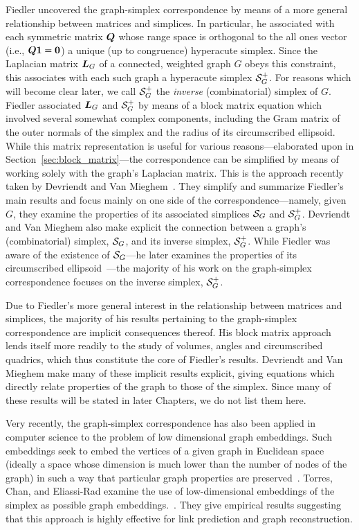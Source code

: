 Fiedler uncovered  the graph-simplex correspondence by means of  a more general  relationship between matrices and simplices.  In particular, he associated with each symmetric matrix $\vb*{Q}$ whose range space is orthogonal to the all ones vector (i.e.,  $\vb*{Q}\vb{1}=\vb{0}$) a unique (up to congruence) hyperacute simplex. Since the Laplacian  matrix  $\vb*{L}_G$ of a connected, weighted graph  $G$ obeys this constraint, this associates with  each such graph a hyperacute simplex  $\mathcal{S}_G^+$.   
For  reasons which will become clear later, we call $\mathcal{S}_G^+$ the \emph{inverse} (combinatorial) simplex of $G$. 
Fiedler associated $\vb*{L}_G$ and $\mathcal{S}_G^+$  by means of a block matrix equation which involved several somewhat complex components, including  the Gram matrix of the outer normals of the simplex and  the radius of its circumscribed ellipsoid. While this matrix representation is useful for various reasons---elaborated upon in  Section~\ref{sec:block_matrix}---the correspondence can  be simplified  by means of working solely  with the graph's Laplacian  matrix. This is the approach  recently taken by Devriendt  and  Van  Mieghem~\cite{devriendt2018simplex}. They simplify and summarize Fiedler's main  results and focus mainly on one  side of the correspondence---namely,  given $G$,  they examine  the properties of  its associated  simplices $\mathcal{S}_G$ and $\mathcal{S}_G^+$. 
Devriendt and  Van Mieghem also make explicit the connection between a graph's (combinatorial) simplex, $\mathcal{S}_G$, and  its  inverse  simplex, $\mathcal{S}_G^+$. While Fiedler was aware  of the existence of  $\mathcal{S}_G$---he later examines the properties of its circumscribed ellipsoid~\cite{fiedler2005geometry}---the  majority of his  work on  the graph-simplex  correspondence focuses on the inverse simplex, $\mathcal{S}_G^+$. 

Due to Fiedler's more general interest in the relationship between matrices and simplices, the majority of  his  results pertaining  to the graph-simplex correspondence are implicit consequences thereof. His block matrix approach lends itself more readily to the study of volumes, angles and circumscribed quadrics, which thus constitute the core of Fiedler's results. Devriendt and Van Mieghem make many of these implicit results explicit, giving equations which directly relate properties of the  graph to those of the simplex. Since many of these results will be stated in later  Chapters,  we do not list them here. 

Very recently, the graph-simplex correspondence has also been applied in  computer science to  the problem of low dimensional graph embeddings. Such embeddings seek to embed the vertices of a given graph in Euclidean space  (ideally a space whose dimension is much  lower than the number of nodes of the  graph)  in such a way that particular graph properties are preserved~\cite{cai2018comprehensive}. 
Torres, Chan, and Eliassi-Rad examine the use of low-dimensional embeddings of the simplex as possible graph  embeddings.~\cite{torres2019geometric}. They give empirical results suggesting that this approach is highly effective for link prediction  and graph  reconstruction. 


